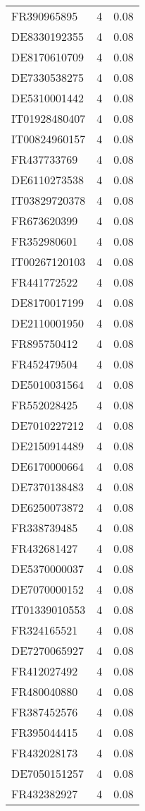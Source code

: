 \begin{table*}[htbp]
\begin{tabular}{lrr}
FR390965895 & 4 & 0.08 \\
DE8330192355 & 4 & 0.08 \\
DE8170610709 & 4 & 0.08 \\
DE7330538275 & 4 & 0.08 \\
DE5310001442 & 4 & 0.08 \\
IT01928480407 & 4 & 0.08 \\
IT00824960157 & 4 & 0.08 \\
FR437733769 & 4 & 0.08 \\
DE6110273538 & 4 & 0.08 \\
IT03829720378 & 4 & 0.08 \\
FR673620399 & 4 & 0.08 \\
FR352980601 & 4 & 0.08 \\
IT00267120103 & 4 & 0.08 \\
FR441772522 & 4 & 0.08 \\
DE8170017199 & 4 & 0.08 \\
DE2110001950 & 4 & 0.08 \\
FR895750412 & 4 & 0.08 \\
FR452479504 & 4 & 0.08 \\
DE5010031564 & 4 & 0.08 \\
FR552028425 & 4 & 0.08 \\
DE7010227212 & 4 & 0.08 \\
DE2150914489 & 4 & 0.08 \\
DE6170000664 & 4 & 0.08 \\
DE7370138483 & 4 & 0.08 \\
DE6250073872 & 4 & 0.08 \\
FR338739485 & 4 & 0.08 \\
FR432681427 & 4 & 0.08 \\
DE5370000037 & 4 & 0.08 \\
DE7070000152 & 4 & 0.08 \\
IT01339010553 & 4 & 0.08 \\
FR324165521 & 4 & 0.08 \\
DE7270065927 & 4 & 0.08 \\
FR412027492 & 4 & 0.08 \\
FR480040880 & 4 & 0.08 \\
FR387452576 & 4 & 0.08 \\
FR395044415 & 4 & 0.08 \\
FR432028173 & 4 & 0.08 \\
DE7050151257 & 4 & 0.08 \\
FR432382927 & 4 & 0.08 \\

\end{tabular}
\end{table*}
